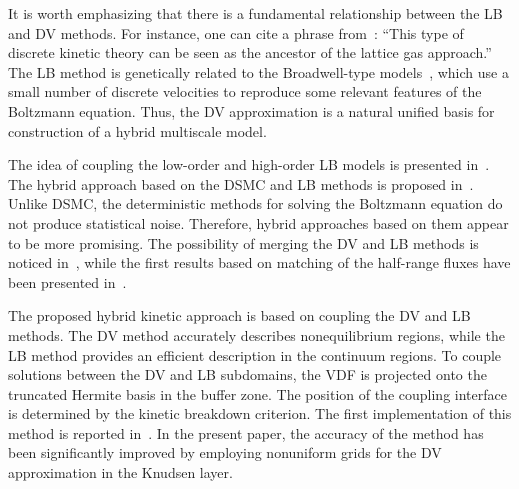 \documentclass{elsarticle} %
\begin{document}
It is worth emphasizing that there is a fundamental relationship between the LB and DV methods.
For instance, one can cite a phrase from~\cite{Rivet2001}:
``This type of discrete kinetic theory can be seen as the ancestor of the lattice gas approach.''
The LB method is genetically related to the Broadwell-type models~\cite{Broadwell1964shock, Gatignol1975},
which use a small number of discrete velocities to reproduce some relevant features of the Boltzmann equation.
Thus, the DV approximation is a natural unified basis for construction of a hybrid multiscale model.

The idea of coupling the low-order and high-order LB models is presented in~\cite{Meng2011}.
The hybrid approach based on the DSMC and LB methods is proposed in~\cite{Staso2016long, Staso2018}.
Unlike DSMC, the deterministic methods for solving the Boltzmann equation do not produce statistical noise.
Therefore, hybrid approaches based on them appear to be more promising.
The possibility of merging the DV and LB methods is noticed in~\cite{Succi2016},
while the first results based on matching of the half-range fluxes have been presented in~\cite{Ilyin2018}.


The proposed hybrid kinetic approach is based on coupling the DV and LB methods.
The DV method accurately describes nonequilibrium regions,
while the LB method provides an efficient description in the continuum regions.
To couple solutions between the DV and LB subdomains,
the VDF is projected onto the truncated Hermite basis in the buffer zone.
The position of the coupling interface is determined by the kinetic breakdown criterion.
The first implementation of this method is reported in~\cite{Aristov2019}.
In the present paper, the accuracy of the method has been significantly improved
by employing nonuniform grids for the DV approximation in the Knudsen layer.
\end{document}
